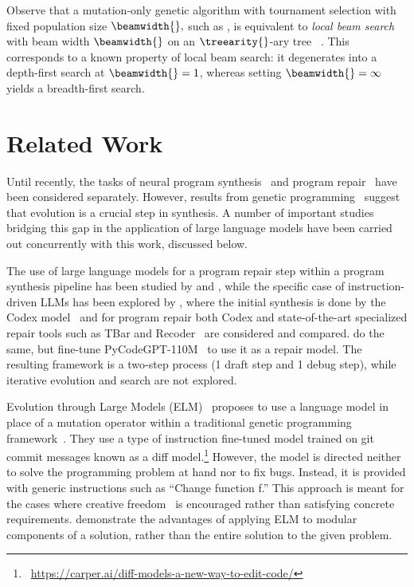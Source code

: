 Observe that a mutation-only genetic algorithm with tournament selection with fixed population size $\beamwidth{},$ such as \method{}, is equivalent to \emph{local beam search} with beam width $\beamwidth{}$ on an $\treearity{}$-ary tree ~\cite[Section 4.1.4]{russell2010:artificial}. This corresponds to a known property of local beam search: it degenerates into a depth-first search at $\beamwidth{} = 1$, whereas setting $\beamwidth{} = \infty$ yields a breadth-first search.


\section{Related Work}
\label{sec:related-work}


Until recently, the tasks of neural program synthesis~\cite{gulwani2017:program} and program repair~\cite{legoues2019:automated, petke2018:genetic, legoues2012:systematic,zhang2024systematic} have been considered separately.
However, results from genetic programming~\cite{sobaniaRecentDevelopmentsProgram2021} suggest that evolution is a crucial step in synthesis.
A number of important studies bridging this gap in the application of large language models have been carried out concurrently with this work, discussed below.

The use of large language models for a program repair step within a program synthesis pipeline has been studied by \citet{joshi2022:repair:arxiv} and \citet{gupta2020:synthesize}, 
while the specific case of instruction-driven LLMs has been explored by \citet{fan2023:automated}, where the initial synthesis is done by the Codex model~\citep{chen2021:evaluating} and for program repair both Codex and state-of-the-art specialized repair tools such as TBar and Recoder~\citep{just2014:defects4j} are considered and compared. 
\citet{zhang2023:selfedit} do the same, but fine-tune PyCodeGPT-110M~\citep{zan2022:cert} to use it as a repair model. 
The resulting framework is a two-step process (1 draft step and 1 debug step), while iterative evolution and search are not explored. 

Evolution through Large Models (ELM)~\citep{lehman2022:evolution} proposes to use a language model in place of a mutation operator within a traditional genetic programming framework~\citep{koza1994:genetic}. They use a type of instruction fine-tuned model trained on git commit messages known as a diff model.\footnote{~\url{https://carper.ai/diff-models-a-new-way-to-edit-code/}}
However, the model is directed neither to solve the programming problem at hand nor to fix bugs.
Instead, it is provided with generic instructions such as ``Change function f.'' 
This approach is meant for the cases where creative freedom~\citep{stanley2015:why} is encouraged rather than satisfying concrete requirements.
\citet{liu2023algorithm} demonstrate the advantages of applying ELM to modular components of a solution, rather than the entire solution to the given problem.

